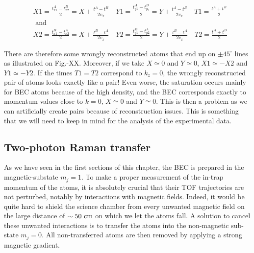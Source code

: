 \begin{equation}
\begin{aligned}
&X 1=\frac{t_{x 1}^{A}-t_{x 2}^{B}}{2}=X+\frac{t^{A}-t^{B}}{2 v_{x}} \quad Y 1=\frac{t_{y 1}^{A}-t_{y_{2}}^{B}}{2}=Y+\frac{t^{A}-t^{B}}{2 v_{x}} \quad T 1=\frac{t^{A}+t^{B}}{2}\\
&\text { and }\\
&X 2=\frac{t_{x 1}^{B}-t_{x 2}^{A}}{2}=X+\frac{t^{B}-t^{A}}{2 v_{x}} \quad Y 2=\frac{t_{y 1}^{B}-t_{y 2}^{A}}{2}=Y+\frac{t^{B}-t^{A}}{2 v_{x}} \quad T 2=\frac{t^{A}+t^{B}}{2}
\end{aligned}
\end{equation}

There are therefore some wrongly reconstructed atoms that end up on $\pm 45^{\circ}$ lines as illustrated on Fig.-XX. Moreover, if we take $X \simeq 0$ and $Y \simeq 0$, $X1 \simeq -X2$ and $Y1 \simeq -Y2$. If the times $T1=T2$ correspond to $k_z=0$, the wrongly reconstructed pair of atoms looks exactly like a \kmk pair! Even worse, the saturation occurs mainly for BEC atoms because of the high density, and the BEC corresponds exactly to momentum values close to $k=0$, \ie  $X \simeq 0$ and $Y \simeq 0$. This is then a problem as we can artificially create \kmk pairs because of reconstruction issues. This is something that we will need to keep in mind for the analysis of the experimental data.


\subsection{Two-photon Raman transfer}

\label{sec:raman}


As we have seen in the first sections of this chapter, the BEC is prepared in the magnetic-substate $m_j=1$. To make a proper measurement of the in-trap momentum of the atoms, it is absolutely crucial that their TOF trajectories are not perturbed, notably by interactions with magnetic fields. Indeed, it would be quite hard to shield the science chamber from every unwanted magnetic field on the large distance of $\sim 50 \ \rm{cm}$ on which we let the atoms fall. A solution to cancel these unwanted interactions is to transfer the atoms into the non-magnetic sub-state $m_j=0$. All non-transferred atoms are then removed by applying a strong magnetic gradient.

